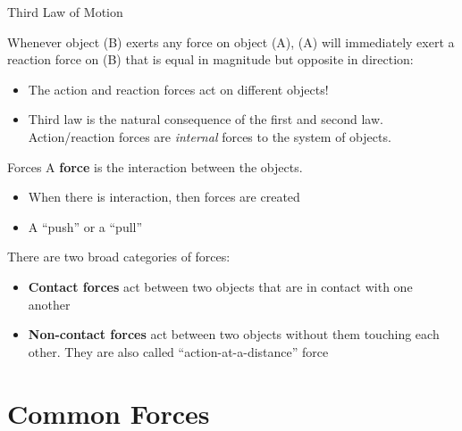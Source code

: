 \documentclass[12pt,compress,aspectratio=169]{beamer}
\begin{document}
\begin{frame}{Third Law of Motion}
  \begin{center}
  \end{center}

  Whenever object (B) exerts any force on object (A), (A) will immediately
  exert a reaction force on (B) that is equal in magnitude but opposite in
  direction:

  \begin{itemize}
  \item The action and reaction forces act on different objects!
  \item Third law is the natural consequence of the first and second law.
    Action/reaction forces are \emph{internal} forces to the system of objects.
  \end{itemize}
\end{frame}



\begin{frame}{Forces}
  A \textbf{force} is the interaction between the objects.
  \begin{itemize}
  \item When there is interaction, then forces are created
  \item A ``push'' or a ``pull''
  \end{itemize}
  There are two broad categories of forces:
  \begin{itemize}
  \item\textbf{Contact forces} act between two objects that are in contact
    with one another
  \item\textbf{Non-contact forces} act between two objects without them
    touching each other. They are also called ``action-at-a-distance'' force
  \end{itemize}
\end{frame}



\section{Common Forces}
\end{document}
